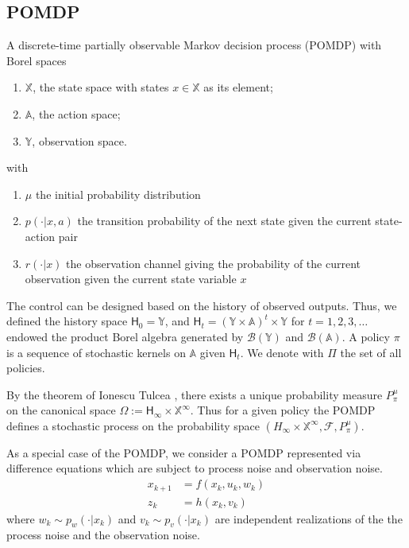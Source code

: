 \documentclass[conference]{IEEEtran}
\newcommand{\X}{{\mathbb{X}}}
\newcommand{\Y}{{\mathbb{Y}}}
\newcommand{\U}{{\mathbb{A}}}
\newcommand{\Hist}{{\mathsf{H}}}
\renewcommand{\P}{P}
\begin{document}
\subsection{POMDP}\label{sec:POMDP}
\begin{definition} \label{def:MDP}
A discrete-time partially observable Markov decision process (POMDP) with Borel spaces
\begin{enumerate}
	\item $\X$, the state space with states $x\in\X$ as its element;
	\item $\U$, the action space;
	\item $\Y$, observation space.
\end{enumerate}
with 
\begin{enumerate}
\item $\mu$ the initial probability distribution
\item $p(\cdot|x,a)$ the transition probability of the next state given the current state-action pair
\item $r(\cdot|x)$ the observation channel giving the probability of the current observation given the current state variable $x$	
\end{enumerate}


\end{definition} 

The control can be designed based on the history of observed outputs. Thus, we defined the history space $\Hist_0=\Y$, and $\Hist_t=(\Y\times \U)^t\times \Y$ for $t=1,2,3,\ldots$ endowed the product Borel algebra generated by $\mathcal B (\Y)$ and $\mathcal B(\U)$.
A policy $\pi$ is a sequence of stochastic kernels on $\U$ given $\Hist_t$. 
We denote with $\Pi$ the set of all policies.



By the theorem of Ionescu Tulcea \cite{hll1996}, there exists a unique probability measure $\P_\pi^\mu$ on the canonical space $\Omega:=\Hist_\infty\times\X^\infty$. Thus for a given policy the POMDP defines a stochastic process on the probability space  
 $(H_\infty\times \X^\infty,\mathcal F,\P_\pi^\mu)$.

As a special case of the POMDP, we consider a POMDP represented via difference equations which are subject to process noise and observation noise.
\begin{align*}
x_{k+1}&=f(x_k,u_k,w_k)\\
z_k&=h(x_k,v_k)
\end{align*}
where $w_k\sim p_w(\cdot|x_k)$ and $v_k\sim p_v(\cdot|x_k)$ are independent realizations of the the process noise and the observation noise.
\end{document}
